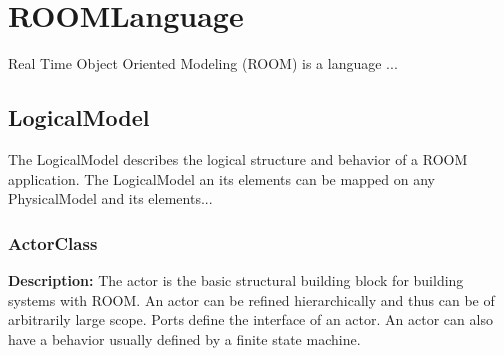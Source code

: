\section{\huge ROOMLanguage}
	Real Time Object Oriented Modeling (ROOM) is a language ... 
	
		\subsection{\huge LogicalModel}
		The LogicalModel describes the logical structure and behavior of a ROOM application. The LogicalModel an its elements can be mapped on any PhysicalModel and its elements...
	
		
		
		\subsubsection{\huge ActorClass}
			\hypertarget{ref:ActorClass}{}
			
			\textbf{Description:} The actor is the basic structural building block for building systems with ROOM. An actor can be refined hierarchically and thus can be of arbitrarily large scope. Ports define the interface of an actor. An actor can also have a behavior usually defined by a finite state machine. 
			

